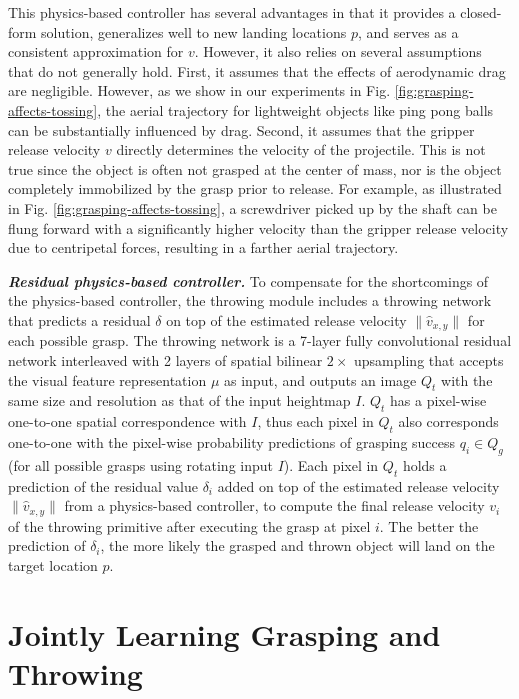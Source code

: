 \documentclass[journal]{IEEEtran}
\newcommand{\mypara}[1]{\par\vspace*{0.8mm}\noindent\textbf{\textit{#1}}}
\begin{document}
This physics-based controller has several advantages in that it provides a closed-form solution, generalizes well to new landing locations $p$, and serves as a consistent approximation for $v$. However, it also relies on several assumptions that do not generally hold. First, it assumes that the effects of aerodynamic drag are negligible. However, as we show in our experiments in Fig. \ref{fig:grasping-affects-tossing}, the aerial trajectory for lightweight objects like ping pong balls can be substantially influenced by drag. Second, it assumes that the gripper release velocity $v$ directly determines the velocity of the projectile. This is not true since the object is often not grasped at the center of mass, nor is the object completely immobilized by the grasp prior to release. For example, as illustrated in Fig. \ref{fig:grasping-affects-tossing}, a screwdriver picked up by the shaft can be flung forward with a significantly higher velocity than the gripper release velocity due to centripetal forces, resulting in a farther aerial trajectory.

\mypara{Residual physics-based controller.} To compensate for the shortcomings of the physics-based controller, the throwing module includes a throwing network that predicts a residual $\delta$ on top of the estimated release velocity $\|\hat{v}_{x,y}\|$ for each possible grasp. The throwing network is a 7-layer fully convolutional residual network \cite{he2016deep} interleaved with 2 layers of spatial bilinear $2\times$ upsampling that accepts the visual feature representation $\mu$ as input, and outputs an image $Q_t$ with the same size and resolution as that of the input heightmap $I$. ${Q_t}$ has a pixel-wise one-to-one spatial correspondence with $I$, thus each pixel in $Q_t$ also corresponds one-to-one with the pixel-wise probability predictions of grasping success $q_i\in{Q_g}$ (for all possible grasps using rotating input $I$). Each pixel in $Q_t$ holds a prediction of the residual value $\delta_i$ added on top of the estimated release velocity $\|\hat{v}_{x,y}\|$ from a physics-based controller, to compute the final release velocity $v_i$ of the throwing primitive after executing the grasp at pixel $i$.
The better the prediction of $\delta_i$, the more likely the grasped and thrown object will land on the target location $p$.

\section{Jointly Learning Grasping and Throwing}
\label{sec:learning-objectives}
\end{document}
